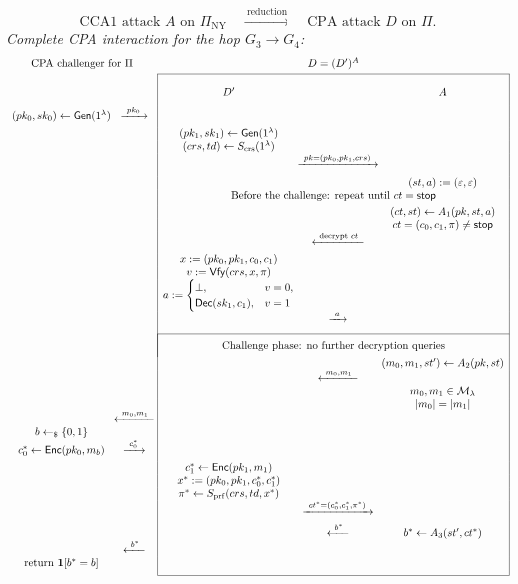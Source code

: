 \documentclass[12pt,a4paper]{article}
\begin{document}
\clearpage
\[
\text{CCA1 attack }A\text{ on }\Pi_{\mathrm{NY}}
\quad\xrightarrow{\ \text{reduction}\ }\quad
\text{CPA attack }D\text{ on }\Pi.
\]
\textit{Complete CPA interaction for the hop $G_3\to G_4$:}
\begingroup\footnotesize
\[
\begin{array}{c@{\;}c@{\;}|c@{\;}c@{\;}c|}
\multicolumn{2}{c}{\text{CPA challenger for }\Pi}&
\multicolumn{3}{c}{D=(D')^A}\\[3pt]
\cline{3-5}
&&\rule{0pt}{20pt}D'&&A\\[6pt]
(pk_0,sk_0)\leftarrow\mathsf{Gen}(1^\lambda)
&\xrightarrow{\ pk_0\ }&&&\\[4pt]
&&(pk_1,sk_1)\leftarrow\mathsf{Gen}(1^\lambda)&&\\
&&(crs,td)\leftarrow S_{\mathrm{crs}}(1^\lambda)&&\\
&&&\xrightarrow{\ pk=(pk_0,pk_1,crs)\ }&\\[5pt]
&&&&(st,a):=(\varepsilon,\varepsilon)\\
&&\multicolumn{3}{c|}{\text{Before the challenge: repeat until }ct=\mathsf{stop}}\\[3pt]
&&&&(ct,st)\leftarrow A_1(pk,st,a)\\
&&&&ct=(c_0,c_1,\pi)\ne\mathsf{stop}\\
&&&\xleftarrow{\ \text{decrypt }ct\ }&\\[4pt]
&&x:=(pk_0,pk_1,c_0,c_1)&&\\
&&v:=\mathsf{Vfy}(crs,x,\pi)&&\\
&&a:=\begin{cases}
\bot,&v=0,\\
\mathsf{Dec}(sk_1,c_1),&v=1
\end{cases}&&\\[4pt]
&&&\xrightarrow{\ a\ }&\\[7pt]
\cline{3-5}
&&\multicolumn{3}{|c|}{\rule{0pt}{14pt}\text{Challenge phase: no further decryption queries}}\\[4pt]
&&&&(m_0,m_1,st')\leftarrow A_2(pk,st)\\
&&&\xleftarrow{\ m_0,m_1\ }&\\
&&&&m_0,m_1\in\mathcal M_\lambda\\
&&&&|m_0|=|m_1|\\
&\xleftarrow{\ m_0,m_1\ }&&&\\
b\leftarrow_{\$}\{0,1\}&&&&\\
c_0^*\leftarrow\mathsf{Enc}(pk_0,m_b)
&\xrightarrow{\ c_0^*\ }&&&\\[4pt]
&&c_1^*\leftarrow\mathsf{Enc}(pk_1,m_1)&&\\
&&x^*:=(pk_0,pk_1,c_0^*,c_1^*)&&\\
&&\pi^*\leftarrow S_{\mathrm{prf}}(crs,td,x^*)&&\\
&&&\xrightarrow{\ ct^*=(c_0^*,c_1^*,\pi^*)\ }&\\[4pt]
&&&\xleftarrow{\ b^*\ }&b^*\leftarrow A_3(st',ct^*)\\
&\xleftarrow{\ b^*\ }&&&\\
\mathrm{return}\ \mathbf 1[b^*=b]&&&&\\[5pt]
\cline{3-5}
\end{array}
\]
\end{document}
